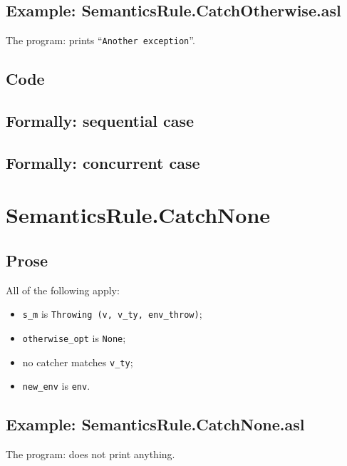 \documentclass{book}
\begin{document}
    \subsection{Example: SemanticsRule.CatchOtherwise.asl}
     The program:
     prints ``\texttt{Another exception}''.

  \subsection{Code}

\begin{emptyformal}
  \subsection{Formally: sequential case}

  \subsection{Formally: concurrent case}
\end{emptyformal}


\section{SemanticsRule.CatchNone \label{sec:SemanticsRule.CatchNone}}

    \subsection{Prose}
    All of the following apply:
    \begin{itemize}
    \item \texttt{s\_m} is \texttt{Throwing (v, v\_ty, env\_throw)};
    \item \texttt{otherwise\_opt} is \texttt{None};
    \item no catcher matches \texttt{v\_ty};
    \item \texttt{new\_env} is \texttt{env}.
    \end{itemize}

    \subsection{Example: SemanticsRule.CatchNone.asl}
    The program:
    does not print anything.
\end{document}
